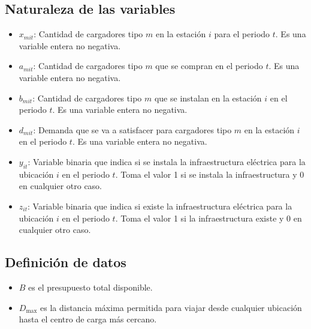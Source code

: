 \documentclass[letterpaper]{article}
\begin{document}
\begin{flushleft}
	\subsection{Naturaleza de las variables}
	\begin{itemize}
		\item $x_{mit}$: Cantidad de cargadores tipo $m$ en la estación $i$ para el periodo $t$. Es una variable entera no negativa.
		\item $a_{mit}$: Cantidad de cargadores tipo $m$ que se compran en el periodo $t$. Es una variable entera no negativa.
		\item $b_{mit}$: Cantidad de cargadores tipo $m$ que se instalan en la estación $i$ en el periodo $t$. Es una variable entera no negativa.
		\item $d_{mit}$: Demanda que se va a satisfacer para cargadores tipo $m$ en la estación $i$ en el periodo $t$. Es una variable entera no negativa.
		\item $y_{it}$: Variable binaria que indica si se instala la infraestructura eléctrica para la ubicación $i$ en el periodo $t$. Toma el valor 1 si se instala la infraestructura y 0 en cualquier otro caso.
		\item $z_{it}$: Variable binaria que indica si existe la infraestructura eléctrica para la ubicación $i$ en el periodo $t$. Toma el valor 1 si la infraestructura existe y 0 en cualquier otro caso.
	\end{itemize}
	\subsection{Definición de datos}
	\begin{itemize}
		\item $B$ es el presupuesto total disponible.
		\item $D_{\text{max}}$ es la distancia máxima permitida para viajar desde cualquier ubicación hasta el centro de carga más cercano.
	\end{itemize}

\end{flushleft}
\end{document}
